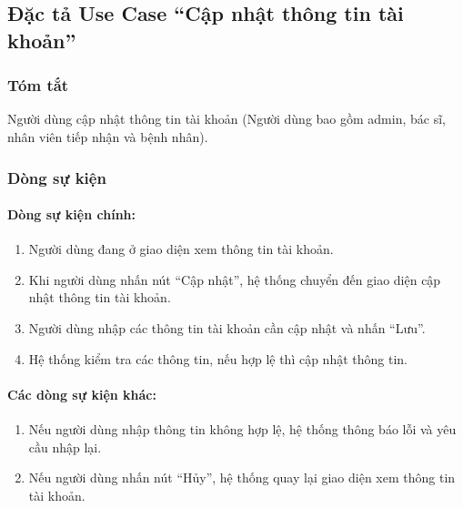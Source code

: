 \subsection{Đặc tả Use Case ``Cập nhật thông tin tài khoản''}

\subsubsection{Tóm tắt}
Người dùng cập nhật thông tin tài khoản (Người dùng bao gồm admin, bác sĩ, nhân viên tiếp nhận và bệnh nhân).

\subsubsection{Dòng sự kiện}
\paragraph{\textbf{Dòng sự kiện chính:}}
\begin{enumerate}
  \item Người dùng đang ở giao diện xem thông tin tài khoản.
  \item Khi người dùng nhấn nút ``Cập nhật'', hệ thống chuyển đến giao diện cập nhật thông tin tài khoản.
  \item Người dùng nhập các thông tin tài khoản cần cập nhật và nhấn ``Lưu''.
  \item Hệ thống kiểm tra các thông tin, nếu hợp lệ thì cập nhật thông tin.
\end{enumerate}

\paragraph{\textbf{Các dòng sự kiện khác:}}
\begin{enumerate}
  \item Nếu người dùng nhập thông tin không hợp lệ, hệ thống thông báo lỗi và yêu cầu nhập lại.
  \item Nếu người dùng nhấn nút ``Hủy'', hệ thống quay lại giao diện xem thông tin tài khoản.
\end{enumerate}

